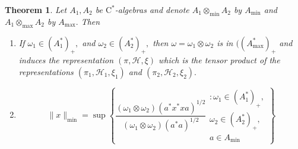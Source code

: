 \documentclass{article}
\theoremstyle{plain}
\newtheorem{theorem}{Theorem}[section]
\theoremstyle{definition}
\theoremstyle{remark}
\begin{document}
\begin{theorem}
    Let $A_1, A_2$ be $\text{C}^\ast$\nobreakdash-algebras and denote $A_1 \otimes_{\min} A_2$ by $A_{\min}$ and $A_1 \otimes_{\max} A_2$
    by $A_{\max}.$ Then 
\begin{enumerate}
	\item If $\omega_1 \in (A_1^\ast)_+,$ and
    $\omega_2 \in (A_2^\ast)_+,$ then $\omega = \omega_1 \otimes \omega_2$ is in $((A_{\max}^\ast)_+$
    and induces the representation $(\pi, \mathcal{H}, \xi)$ which is the tensor product of the representations
    $(\pi_1, \mathcal{H}_1, \xi_1)$ and $(\pi_2, \mathcal{H}_2, \xi_2).$
\item $$\lVert x \rVert_{\min} = 
	\sup \left\{ \frac{(\omega_1 \otimes \omega_2) (a^\ast x^\ast x a)^{1/2} }
		{ (\omega_1 \otimes \omega_2)(a^\ast a)^{1/2} } 
\begin{array}{c}
	\colon \omega_1 \in (A_1^\ast)_+, \\
	\omega_2 \in (A_2^\ast)_+ ,\\
	a \in A_{\min}
\end{array}
\right\} $$
\end{enumerate}
\end{theorem}
\end{document}
